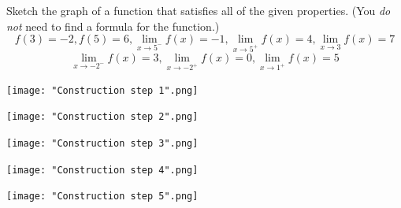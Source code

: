 \documentclass[nooutcomes]{ximera}
\begin{document}
					

\begin{problem}
Sketch the graph of a function that satisfies all of the given properties.
  (You \emph{do not} need to find a formula for the function.)
	$$ f(3) = -2 , f(5) = 6 , \lim_{x \to 5^-} f(x) = -1 ,   \lim_{x \to 5^+} f(x) = 4 ,  \lim_{x \to 3} f(x) = 7 $$
	$$  \lim_{x \to -2^-} f(x) = 3 ,  \lim_{x \to -2^+} f(x) = 0 ,  \lim_{x \to 1^+} f(x) = 5  $$
	\begin{freeResponse} \hfil
	    \begin{image}
      \texttt{[image: "Construction step 1".png]}
    \end{image}
    \begin{image}
      \texttt{[image: "Construction step 2".png]}
    \end{image}
    \begin{image}
      \texttt{[image: "Construction step 3".png]}
    \end{image}
    \begin{image}
      \texttt{[image: "Construction step 4".png]}
    \end{image}
    \begin{image}
      \texttt{[image: "Construction step 5".png]}
    \end{image}
	\end{freeResponse}
\end{problem}
	
	
	
	
\end{document}
